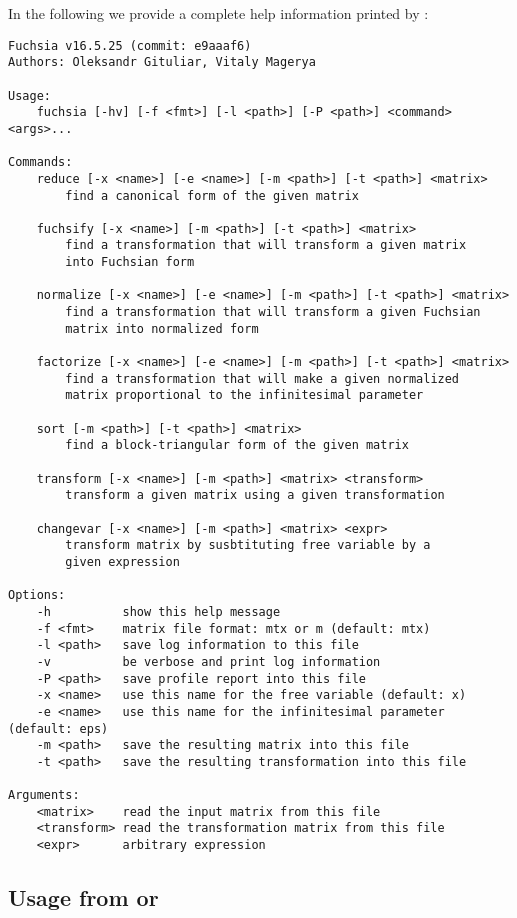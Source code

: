 \documentclass[12pt,a4paper]{article}
\begin{document}
In the following we provide a complete help information printed by :
{\small
\begin{verbatim}
Fuchsia v16.5.25 (commit: e9aaaf6)
Authors: Oleksandr Gituliar, Vitaly Magerya

Usage:
    fuchsia [-hv] [-f <fmt>] [-l <path>] [-P <path>] <command> <args>...

Commands:
    reduce [-x <name>] [-e <name>] [-m <path>] [-t <path>] <matrix>
        find a canonical form of the given matrix

    fuchsify [-x <name>] [-m <path>] [-t <path>] <matrix>
        find a transformation that will transform a given matrix
        into Fuchsian form

    normalize [-x <name>] [-e <name>] [-m <path>] [-t <path>] <matrix>
        find a transformation that will transform a given Fuchsian
        matrix into normalized form

    factorize [-x <name>] [-e <name>] [-m <path>] [-t <path>] <matrix>
        find a transformation that will make a given normalized
        matrix proportional to the infinitesimal parameter

    sort [-m <path>] [-t <path>] <matrix>
        find a block-triangular form of the given matrix

    transform [-x <name>] [-m <path>] <matrix> <transform>
        transform a given matrix using a given transformation

    changevar [-x <name>] [-m <path>] <matrix> <expr>
        transform matrix by susbtituting free variable by a
        given expression

Options:
    -h          show this help message
    -f <fmt>    matrix file format: mtx or m (default: mtx)
    -l <path>   save log information to this file
    -v          be verbose and print log information
    -P <path>   save profile report into this file
    -x <name>   use this name for the free variable (default: x)
    -e <name>   use this name for the infinitesimal parameter (default: eps)
    -m <path>   save the resulting matrix into this file
    -t <path>   save the resulting transformation into this file

Arguments:
    <matrix>    read the input matrix from this file
    <transform> read the transformation matrix from this file
    <expr>      arbitrary expression
\end{verbatim}}


\subsection{Usage from \sage or \python}
\label{sec:usage_py}
\end{document}
